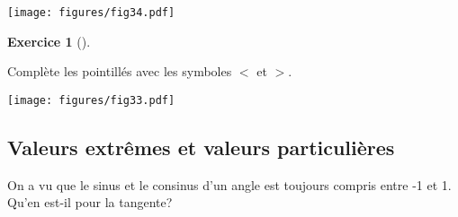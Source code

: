 \documentclass[
  a4paper,
  DIV=11,
  numbers=noendperiod,
  oneside]{scrreprt}
\theoremstyle{definition}
\theoremstyle{definition}
\newtheorem{exercise}{Exercice}[chapter]
\theoremstyle{plain}
\theoremstyle{definition}
\theoremstyle{remark}
\begin{document}
\begin{center}
\texttt{[image: figures/fig34.pdf]}
\end{center}

\begin{exercise}[]\protect\hypertarget{exr-signe-sincos}{}\label{exr-signe-sincos}

Complète les pointillés avec les symboles \(<\) et \(>\). \begin{center}
\texttt{[image: figures/fig33.pdf]}
\end{center}

\end{exercise}

\subsection{Valeurs extrêmes et valeurs
particulières}\label{valeurs-extruxeames-et-valeurs-particuliuxe8res-1}

On a vu que le sinus et le consinus d'un angle est toujours compris
entre -1 et 1. Qu'en est-il pour la tangente?
\end{document}
